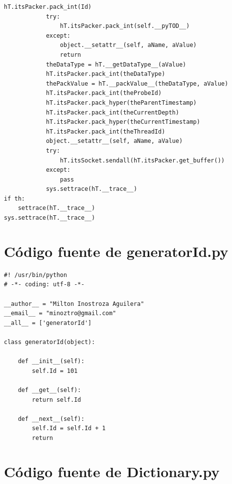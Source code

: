 \documentclass[12pt,legalpaper]{report}
\begin{document}
\begin{singlespace}
\begin{lstlisting}[style=Python]
            hT.itsPacker.pack_int(Id)
            try:
                hT.itsPacker.pack_int(self.__pyTOD__)
            except:
                object.__setattr__(self, aName, aValue)
                return
            theDataType = hT.__getDataType__(aValue)
            hT.itsPacker.pack_int(theDataType)
            thePackValue = hT.__packValue__(theDataType, aValue)
            hT.itsPacker.pack_int(theProbeId)
            hT.itsPacker.pack_hyper(theParentTimestamp)        
            hT.itsPacker.pack_int(theCurrentDepth)
            hT.itsPacker.pack_hyper(theCurrentTimestamp)
            hT.itsPacker.pack_int(theThreadId)
            object.__setattr__(self, aName, aValue)
            try:
                hT.itsSocket.sendall(hT.itsPacker.get_buffer())
            except:
                pass   
            sys.settrace(hT.__trace__)
if th:
    settrace(hT.__trace__)  
sys.settrace(hT.__trace__)
\end{lstlisting}
\end{singlespace}

	\section{Código fuente de generatorId.py}
	

\begin{singlespace}
\begin{lstlisting}[style=Python]
#! /usr/bin/python
# -*- coding: utf-8 -*-

__author__ = "Milton Inostroza Aguilera"
__email__ = "minoztro@gmail.com"
__all__ = ['generatorId']

class generatorId(object):
    
    def __init__(self):
        self.Id = 101

    def __get__(self):
        return self.Id

    def __next__(self):
        self.Id = self.Id + 1
        return 
\end{lstlisting}
\end{singlespace}

	\section{Código fuente de Dictionary.py}
\end{document}
